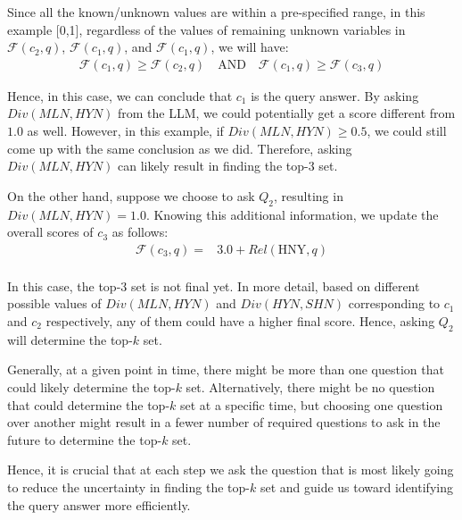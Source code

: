 Since all the known/unknown values are within a pre-specified range, in this example [0,1], regardless of the values of remaining unknown variables in $\mathcal{F}(c_2, q)$, $\mathcal{F}(c_1, q)$, and $\mathcal{F}(c_1, q)$, we will have:
    \[
\begin{aligned}
    \mathcal{F}(c_1, q) \geq \mathcal{F}(c_2, q) \quad \text{AND} \quad
    \mathcal{F}(c_1, q) \geq \mathcal{F}(c_3, q)
\end{aligned}
\]

    Hence, in this case, we can conclude that $c_1$ is the query answer. By asking \(Div(MLN, HYN)\) from the LLM, we could potentially get a score different from $1.0$ as well. However, in this example, if \(Div(MLN, HYN) \geq 0.5 \), we could still come up with the same conclusion as we did. Therefore, asking \(Div(MLN, HYN)\) can likely result in finding the top-$3$ set.  

 On the other hand, suppose we choose to ask \( Q_2 \), resulting in \(Div(MLN, HYN) = 1.0 \). Knowing this additional information, we update the overall scores of \( c_3 \) as follows:  
    \[
    \begin{aligned}
        \mathcal{F}(c_3, q) = 
         & 3.0 + Rel(\text{HNY},q) \\
    \end{aligned}
    \]

In this case, the top-$3$ set is not final yet. In more detail, based on different possible values of $Div(MLN, HYN)$ and $Div(HYN, SHN)$ corresponding to $c_1$ and $c_2$ respectively, any of them could have a higher final score. Hence, asking $Q_2$ will determine the top-$k$ set. 

    Generally, at a given point in time, there might be more than one question that could likely determine the top-$k$ set. Alternatively, there might be no question that could determine the top-$k$ set at a specific time, but choosing one question over another might result in a fewer number of required questions to ask in the future to determine the top-$k$ set. 
        
    Hence, it is crucial that at each step we ask the question that is most likely going to reduce the uncertainty in finding the top-$k$ set and guide us toward identifying the query answer more efficiently.






